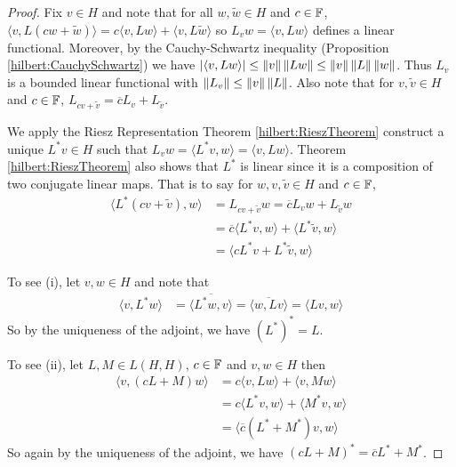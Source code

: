 \begin{proof}
  Fix $v \in H$ and note that for all $w, \tilde{w} \in H$ and $c \in
  \mathbb{F}$, $\langle v, L\left(cw + \tilde{w}\right) \rangle = c\langle v, Lw\rangle +
  \langle v, L\tilde{w} \rangle$ so $L_v w  = \langle v, Lw \rangle$
  defines a linear functional.   Moreover, by the Cauchy-Schwartz
  inequality (Proposition \ref{hilbert:CauchySchwartz}) we have
  $\left \vert   \langle v, Lw \rangle \right \vert  \leq \left \lVert v \right \rVert \left \lVert Lw \right \rVert \leq \left \lVert v \right \rVert \left \lVert L \right \rVert
\left \lVert w \right \rVert$.  Thus $L_v$ is a bounded
linear functional with $\left \lVert L_v \right \rVert \leq \left \lVert v \right \rVert \left \lVert L \right \rVert$. Also note
that for $v, \tilde{v} \in H$ and $c \in \mathbb{F}$, $L_{cv + \tilde{v}}
= \overline{c} L_v + L_{\tilde{v}}$.

We apply the Riesz Representation Theorem \ref{hilbert:RieszTheorem} construct a
unique $L^*v \in H$ such that $L_v w = \langle L^*v, w \rangle =
\langle v, L w \rangle$.   Theorem \ref{hilbert:RieszTheorem}  also
shows that $L^*$ is linear since it is a composition of two conjugate linear
maps.  That is to say for $w, v, \tilde{v} \in H$ and $c \in \mathbb{F}$,
\begin{align*}
  \langle L^*\left(cv + \tilde{v}\right), w \rangle
  &= L_{cv +\tilde{v}} w = \overline{c} L_v w + L_{\tilde{v}}w \\
  &=\overline{c} \langle L^*v, w \rangle + \langle L^*\tilde{v}, w \rangle\\
  &=\langle cL^*v + L^*\tilde{v}, w \rangle 
\end{align*}

To see (i), let $v,w \in H$ and note that
\begin{align*}
  \langle v, L^* w \rangle
  &= \overline{\langle L^* w, v \rangle}
    = \overline{\langle w, L v \rangle}
    = \langle L v, w \rangle
\end{align*}
So by the uniqueness of the adjoint, we have $\left(L^*\right)^* = L$.

To see (ii), let $L, M \in L(H,H)$, $c \in \mathbb{F}$ and $v,w \in H$
then
\begin{align*}
  \langle v, \left(cL + M \right) w \rangle
  &= c\langle v, Lw \rangle + \langle v,M w \rangle \\
  &= c\langle L^* v, w \rangle + \langle M^* v, w \rangle \\
  &= \langle \overline{c} \left( L^*+M^*\right) v, w \rangle
\end{align*}
So again by the uniqueness of the adjoint, we have $\left(cL +
  M\right)^* = \overline{c} L^* + M^*$.
                                  

\end{proof}
